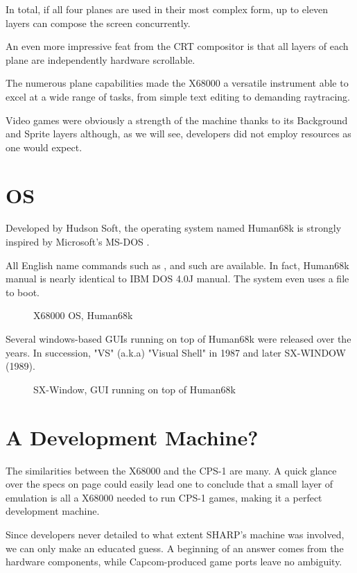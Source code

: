 In total, if all four planes are used in their most complex form, up to eleven layers can compose the screen concurrently. 

An even more impressive feat from the CRT compositor is that all layers of each plane are independently hardware scrollable.

The numerous plane capabilities made the X68000 a versatile instrument able to excel at a wide range of tasks, from simple text editing to demanding raytracing. 

Video games were obviously a strength of the machine thanks to its Background and Sprite layers although, as we will see, developers did not employ resources as one would expect.



\section{OS}
Developed by Hudson Soft, the operating system named Human68k is strongly inspired by Microsoft's MS-DOS . 

All English name commands such as ,  and such are available. In fact, Human68k manual is nearly identical to IBM DOS 4.0J manual\cite{human68k_manual}. The system even uses a  file to boot.

\begin{figure}[H]
\caption*{X68000 OS, Human68k}
\end{figure}


Several windows-based GUIs running on top of Human68k were released over the years. In succession, "VS" (a.k.a) "Visual Shell" in 1987 and later SX-WINDOW (1989).

\begin{figure}[H]
\caption*{SX-Window, GUI running on top of Human68k}
\end{figure}



\section{A Development Machine?}
The similarities between the X68000 and the CPS-1 are many. A quick glance over the specs on page \pageref{x68000-specs} could easily lead one to conclude that a small layer of emulation is all a X68000 needed to run CPS-1 games, making it a perfect development machine. 

Since developers never detailed to what extent SHARP's machine was involved, we can only make an educated guess. A beginning of an answer comes from the hardware components, while Capcom-produced game ports leave no ambiguity.

